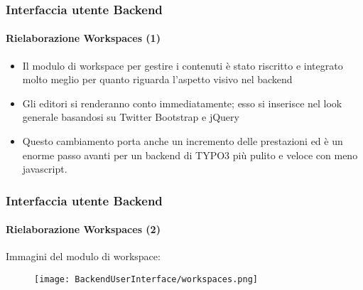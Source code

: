 \begin{frame}[fragile]
	\frametitle{Interfaccia utente Backend}
	\framesubtitle{Rielaborazione Workspaces (1)}

	\begin{itemize}

		\item Il modulo di workspace per gestire i contenuti è stato riscritto e
			integrato molto meglio per quanto riguarda l'aspetto visivo nel backend

		\item Gli editori si renderanno conto immediatamente; esso si inserisce nel look generale
			basandosi su Twitter Bootstrap e jQuery

		\item Questo cambiamento porta anche un incremento delle prestazioni ed è un enorme passo
			avanti per un backend di TYPO3 più pulito e veloce con meno javascript.

	\end{itemize}

\end{frame}

\begin{frame}[fragile]
	\frametitle{Interfaccia utente Backend}
	\framesubtitle{Rielaborazione Workspaces (2)}

	Immagini del modulo di workspace:

	\begin{figure}
		\texttt{[image: BackendUserInterface/workspaces.png]}
	\end{figure}

\end{frame}

